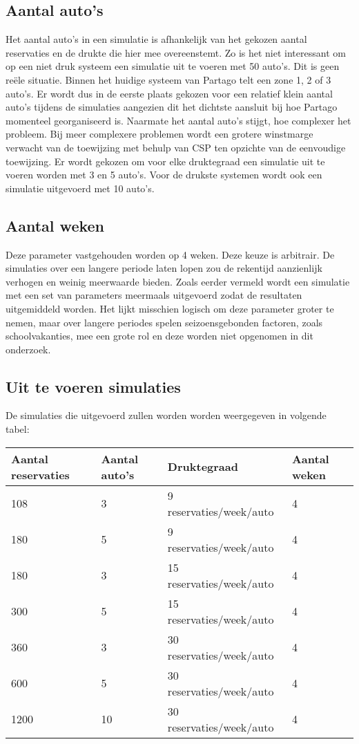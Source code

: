 \subsection{Aantal auto's}
Het aantal auto's in een simulatie is afhankelijk van het gekozen aantal reservaties en de drukte die hier mee overeenstemt. Zo is het niet interessant om op een niet druk systeem een simulatie uit te voeren met 50 auto's. Dit is geen reële situatie. Binnen het huidige systeem van Partago telt een zone 1, 2 of 3 auto's. Er wordt dus in de eerste plaats gekozen voor een relatief klein aantal auto's tijdens de simulaties aangezien dit het dichtste aansluit bij hoe Partago momenteel georganiseerd is. Naarmate het aantal auto's stijgt, hoe complexer het probleem. Bij meer complexere problemen wordt een grotere winstmarge verwacht van de toewijzing met behulp van CSP ten opzichte van de eenvoudige toewijzing. Er wordt gekozen om voor elke druktegraad een simulatie uit te voeren worden met 3 en 5 auto's. Voor de drukste systemen wordt ook een simulatie uitgevoerd met 10 auto's.
\subsection{Aantal weken}
Deze parameter vastgehouden worden op 4 weken. Deze keuze is arbitrair. De simulaties over een langere periode laten lopen zou de rekentijd aanzienlijk verhogen en weinig meerwaarde bieden. Zoals eerder vermeld wordt een simulatie met een set van parameters meermaals uitgevoerd zodat de resultaten uitgemiddeld worden. Het lijkt misschien logisch om deze parameter groter te nemen, maar over langere periodes spelen seizoensgebonden factoren, zoals schoolvakanties, mee een grote rol en deze worden niet opgenomen in dit onderzoek.
\subsection{Uit te voeren simulaties}
De simulaties die uitgevoerd zullen worden worden weergegeven in volgende tabel:
\begin{center}
	\begin{tabular}{ | l | l | l | p{3cm} |}
		\hline
		Aantal reservaties & Aantal auto's & Druktegraad & Aantal weken \\ \hline
		108 & 3 & 9 reservaties/week/auto & 4 \\ \hline
		180 & 5 & 9 reservaties/week/auto & 4 \\ \hline
		180 & 3 & 15 reservaties/week/auto & 4 \\ \hline
		300 & 5 & 15 reservaties/week/auto & 4 \\ \hline
		360 & 3 & 30 reservaties/week/auto & 4 \\ \hline
		600 & 5 & 30 reservaties/week/auto & 4 \\ \hline
		1200 & 10 & 30 reservaties/week/auto & 4 \\ \hline
	\end{tabular}
\end{center} 

